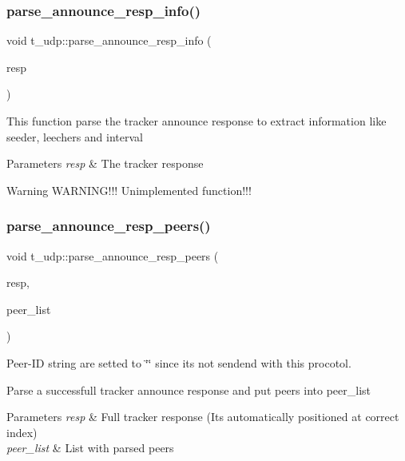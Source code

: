 \subsubsection{\texorpdfstring{parse\+\_\+announce\+\_\+resp\+\_\+info()}{parse\_announce\_resp\_info()}}
{\footnotesize\ttfamily void t\+\_\+udp\+::parse\+\_\+announce\+\_\+resp\+\_\+info (\begin{DoxyParamCaption}\item[{std\+::vector$<$ uint8\+\_\+t $>$ \&}]{resp }\end{DoxyParamCaption})}

This function parse the tracker announce response to extract information like seeder, leechers and interval


\begin{DoxyParams}{Parameters}
{\em resp} & The tracker response\\
\hline
\end{DoxyParams}
\begin{DoxyWarning}{Warning}
W\+A\+R\+N\+I\+N\+G!!! Unimplemented function!!! 
\end{DoxyWarning}
\mbox{\label{namespacet__udp_a8aa6906fdd81689928634df34688fed1}} 
\subsubsection{\texorpdfstring{parse\+\_\+announce\+\_\+resp\+\_\+peers()}{parse\_announce\_resp\_peers()}}
{\footnotesize\ttfamily void t\+\_\+udp\+::parse\+\_\+announce\+\_\+resp\+\_\+peers (\begin{DoxyParamCaption}\item[{std\+::vector$<$ uint8\+\_\+t $>$ \&}]{resp,  }\item[{\hyperlink{namespacepwp_ad07fa6df116b205302ad5ec172277184}{pwp\+::\+Peer\+List}}]{peer\+\_\+list }\end{DoxyParamCaption})}



Peer-\/\+ID string are setted to \char`\"{}\char`\"{} since it\textquotesingle{}s not sendend with this procotol. 

Parse a successfull tracker announce response and put peers into peer\+\_\+list


\begin{DoxyParams}{Parameters}
{\em resp} & Full tracker response (It\textquotesingle{}s automatically positioned at correct index) \\
\hline
{\em peer\+\_\+list} & List with parsed peers \\
\hline
\end{DoxyParams}
\mbox{\label{namespacet__udp_aab582ebbfac6fd929e811527e44384c1}} 
